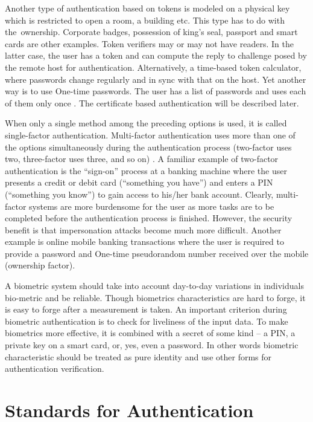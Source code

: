 \begin{multicols}{2}
Another type of authentication based on tokens is modeled on a physical key which is restricted to open a room, a building etc. This type has to do with the ownership. Corporate badges, possession of king's seal, passport and smart cards are other examples. Token verifiers may or may not have readers. In the latter case, the user has a token and can compute the reply to challenge posed by the remote host for authentication. Alternatively, a time-based token calculator, where passwords change regularly and in sync with that on the host. Yet another way is to use One-time passwords. The user has a list of passwords and uses each of them only once \cite{chap2-key2}. The certificate based authentication will be described later.

When only a single method among the preceding options is used, it is called single-factor authentication. Multi-factor authentication uses more than one of the options simultaneously during the authentication process (two-factor uses two, three-factor uses three, and so on) \cite{chap2-key2}. A familiar example of two-factor authentication is the ``sign-on'' process at a banking machine where the user presents a credit or debit card (``something you have'') and enters a PIN (``something you know'') to gain access to his/her bank account. Clearly, multi-factor systems are more burdensome for the user as more tasks are to be completed before the authentication process is finished. However, the security benefit is that impersonation attacks become much more difficult. Another example is online mobile banking transactions where the user is required to provide a password and One-time pseudorandom number received over the mobile (ownership factor).

A biometric system should take into account day-to-day variations in individuals bio-metric and be reliable. Though biometrics characteristics are hard to forge, it is easy to forge after a measurement is taken. An important criterion during biometric authentication is to check for liveliness of the input data. To make biometrics more effective, it is combined with a secret of some kind -- a PIN, a private key on a smart card, or, yes, even a password. In other words biometric characteristic should be treated as pure identity and use other forms for authentication verification.

\section*{Standards for Authentication}


\end{multicols}
